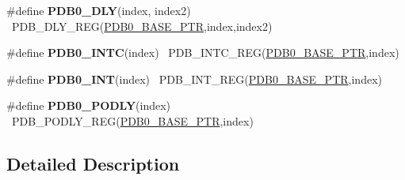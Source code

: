 \begin{DoxyCompactItemize}
\item 
\hypertarget{group___p_d_b___register___accessor___macros_ga06f990bbf5fefa38e0869222b149b921}{}\#define {\bfseries P\+D\+B0\+\_\+\+D\+L\+Y}(index,  index2)                                  ~P\+D\+B\+\_\+\+D\+L\+Y\+\_\+\+R\+E\+G(\hyperlink{group___p_d_b___peripheral_ga8e197b7c43fd7a0bf1a38caa1918b7b5}{P\+D\+B0\+\_\+\+B\+A\+S\+E\+\_\+\+P\+T\+R},index,index2)\label{group___p_d_b___register___accessor___macros_ga06f990bbf5fefa38e0869222b149b921}

\item 
\hypertarget{group___p_d_b___register___accessor___macros_ga499b47f8a74429ad40337dcc6afbd15b}{}\#define {\bfseries P\+D\+B0\+\_\+\+I\+N\+T\+C}(index)                                              ~P\+D\+B\+\_\+\+I\+N\+T\+C\+\_\+\+R\+E\+G(\hyperlink{group___p_d_b___peripheral_ga8e197b7c43fd7a0bf1a38caa1918b7b5}{P\+D\+B0\+\_\+\+B\+A\+S\+E\+\_\+\+P\+T\+R},index)\label{group___p_d_b___register___accessor___macros_ga499b47f8a74429ad40337dcc6afbd15b}

\item 
\hypertarget{group___p_d_b___register___accessor___macros_gaa8334646c20ab13a2415dc68012435ce}{}\#define {\bfseries P\+D\+B0\+\_\+\+I\+N\+T}(index)                                                ~P\+D\+B\+\_\+\+I\+N\+T\+\_\+\+R\+E\+G(\hyperlink{group___p_d_b___peripheral_ga8e197b7c43fd7a0bf1a38caa1918b7b5}{P\+D\+B0\+\_\+\+B\+A\+S\+E\+\_\+\+P\+T\+R},index)\label{group___p_d_b___register___accessor___macros_gaa8334646c20ab13a2415dc68012435ce}

\item 
\hypertarget{group___p_d_b___register___accessor___macros_ga4c603d9ef0923897a580a84d7d6bb25c}{}\#define {\bfseries P\+D\+B0\+\_\+\+P\+O\+D\+L\+Y}(index)                                            ~P\+D\+B\+\_\+\+P\+O\+D\+L\+Y\+\_\+\+R\+E\+G(\hyperlink{group___p_d_b___peripheral_ga8e197b7c43fd7a0bf1a38caa1918b7b5}{P\+D\+B0\+\_\+\+B\+A\+S\+E\+\_\+\+P\+T\+R},index)\label{group___p_d_b___register___accessor___macros_ga4c603d9ef0923897a580a84d7d6bb25c}

\end{DoxyCompactItemize}


\subsection{Detailed Description}
